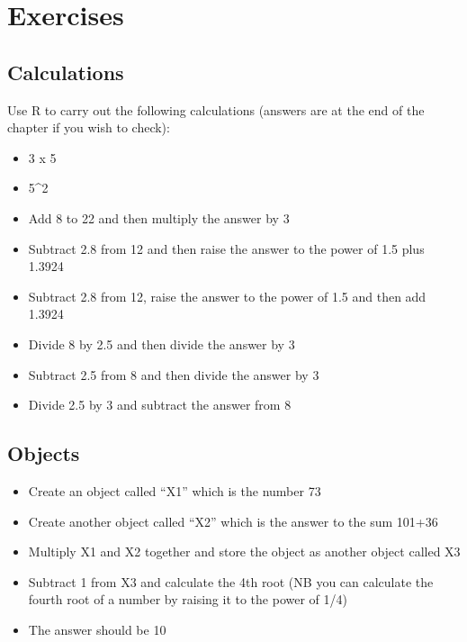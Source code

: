 \documentclass[
]{book}
\begin{document}
\hypertarget{exercises}{%
\section{Exercises}\label{exercises}}

\hypertarget{calculations}{%
\subsection{Calculations}\label{calculations}}

Use R to carry out the following calculations (answers are at the end of the chapter if you wish to check):

\begin{itemize}
\item
  3 x 5
\item
  5\^{}2
\item
  Add 8 to 22 and then multiply the answer by 3
\item
  Subtract 2.8 from 12 and then raise the answer to the power of 1.5 plus 1.3924
\item
  Subtract 2.8 from 12, raise the answer to the power of 1.5 and then add 1.3924
\item
  Divide 8 by 2.5 and then divide the answer by 3
\item
  Subtract 2.5 from 8 and then divide the answer by 3
\item
  Divide 2.5 by 3 and subtract the answer from 8
\end{itemize}

\hypertarget{objects-1}{%
\subsection{Objects}\label{objects-1}}

\begin{itemize}
\item
  Create an object called ``X1'' which is the number 73
\item
  Create another object called ``X2'' which is the answer to the sum 101+36
\item
  Multiply X1 and X2 together and store the object as another object called X3
\item
  Subtract 1 from X3 and calculate the 4th root (NB you can calculate the fourth root of a number by raising it to the power of 1/4)
\item
  The answer should be 10
\end{itemize}
\end{document}
